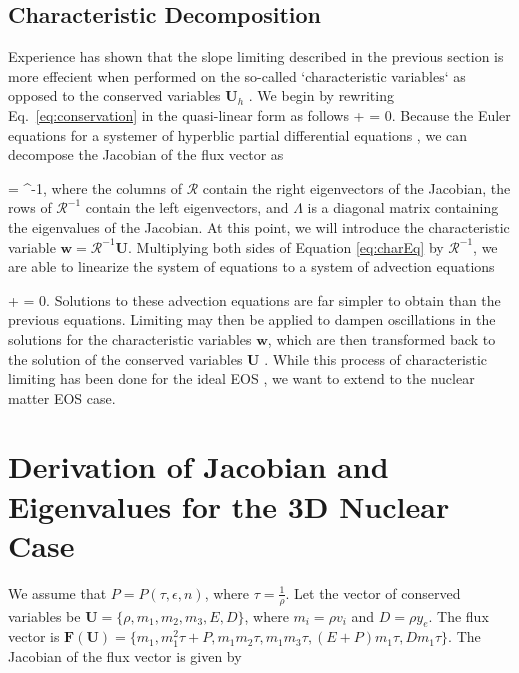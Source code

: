 \documentclass[onecolumn]{aastex62}
\begin{document}
\subsection{Characteristic Decomposition}
\label{sec:characteristicDecomp}
Experience has shown that the slope limiting described in the previous section
is more effecient when performed on the so-called `characteristic variables`
as opposed to the conserved variables $\mathbf{U}_h$
\citep[see, e.g.,][for a description]{cockburn:1998}. We begin by
rewriting Eq.~\eqref{eq:conservation} in the quasi-linear form as follows
\beq
  +  
  = 0.
  \label{eq:charEq}
\eeq
Because the Euler equations for a systemer of hyperblic
partial differential equations \citep[see, e.g.,][]{leveque:1992}, we can decompose the
Jacobian of the flux vector as

\beq
   =
   \Lambda {}^{-1},
\eeq
where the columns of $\mathcal{R}$ contain the right eigenvectors of the Jacobian,
the rows of $\mathcal{R}^{-1}$ contain the left eigenvectors, and
$\Lambda$ is a diagonal matrix containing the eigenvalues of the Jacobian.
At this point, we will introduce the characteristic variable
$\mathbf{w} = \mathcal{R}^{-1}\mathbf{U}$. Multiplying both sides of Equation
\eqref{eq:charEq} by $\mathcal{R}^{-1}$, we are able to linearize the system of equations to
a system of advection equations

\beq
   +
  \Lambda {}
  = 0.
\eeq
Solutions to these advection equations are far simpler to obtain than the
previous equations. Limiting may then be applied to dampen oscillations in the
solutions for the characteristic variables $\mathbf{w}$, which are then
transformed back to the solution of the conserved variables $\mathbf{U}$
\citep[see e.g.,][for a description]{cockburn:1998, schaal:2015a}. While this
process of characteristic limiting has been done for the ideal EOS
\citep[][]{cockburn:1998}, we want
to extend to the nuclear matter EOS case.


\section{Derivation of Jacobian and Eigenvalues for the 3D Nuclear Case}
\label{sec:eigen}

We assume that $P = P(\tau, \epsilon, n)$, where $\tau = \frac{1}{\rho}$.
Let the vector of conserved variables be $\textbf{U} = \{\rho, m_1, m_2, m_3, E, D\}$,
where $m_i = \rho v_i$ and $D = \rho y_{e}$.
The flux vector is $\textbf{F}(\textbf{U}) =
\{m_{1}, m_{1}^{2}\tau + P, m_{1}m_{2}\tau, m_{1}m_{3}\tau,
(E+P)m_{1}\tau, Dm_{1}\tau\}$. The Jacobian of the flux vector is given by
\end{document}
